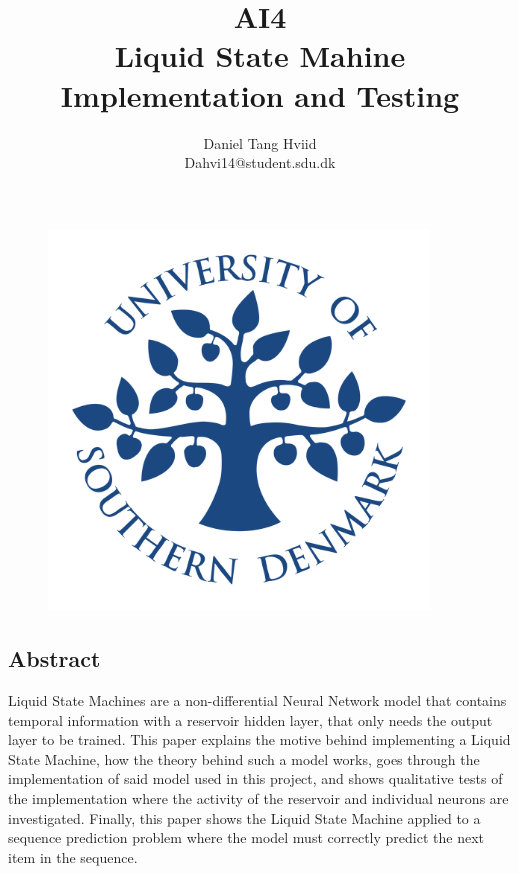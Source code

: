 \documentclass[english,a5paper,oneside, onecolumn,article,9pt]{memoir}
\title{\Huge{AI4} \Large{ \\ Liquid State Mahine \\ Implementation and Testing}}
\author{Daniel Tang Hviid \\ Dahvi14@student.sdu.dk}
\begin{document}
\maketitle

\begin{figure}[h]
    \centering
        \includegraphics[width=0.9\textwidth]{Images/Logo.png}
\end{figure}

\newpage

\begin{centering}
\section*{Abstract}
\end{centering}


Liquid State Machines are a non-differential Neural Network model that contains temporal information with a reservoir hidden layer, that only needs the output layer to be trained.
This paper explains the motive behind implementing a Liquid State Machine, how the theory behind such a model works, goes through the implementation of said model used in this project, and shows qualitative tests of the implementation where the activity of the reservoir and individual neurons are investigated.
Finally, this paper shows the Liquid State Machine applied to a sequence prediction problem where the model must correctly predict the next item in the sequence.


\tableofcontents
\newpage

\saythanks















\end{document}
